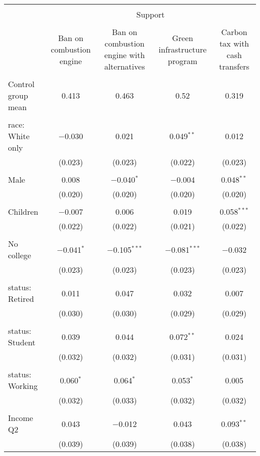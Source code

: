 
\begin{tabular}{@{\extracolsep{5pt}}lcccc} 
\\[-1.8ex]\hline 
\hline \\[-1.8ex] 
 & \multicolumn{4}{c}{Support} \\ 
\cline{2-5} 
\\[-1.8ex] & Ban on combustion engine & Ban on combustion engine with alternatives & Green infrastructure program & Carbon tax with cash transfers \\ 
\hline \\[-1.8ex] 
 Control group mean & 0.413 & 0.463 & 0.52 & 0.319  \\ \hline \\[-1.8ex] race: White only & $-$0.030 & 0.021 & 0.049$^{**}$ & 0.012 \\ 
  & (0.023) & (0.023) & (0.022) & (0.023) \\ 
  & & & & \\ 
 Male & 0.008 & $-$0.040$^{*}$ & $-$0.004 & 0.048$^{**}$ \\ 
  & (0.020) & (0.020) & (0.020) & (0.020) \\ 
  & & & & \\ 
 Children & $-$0.007 & 0.006 & 0.019 & 0.058$^{***}$ \\ 
  & (0.022) & (0.022) & (0.021) & (0.022) \\ 
  & & & & \\ 
 No college & $-$0.041$^{*}$ & $-$0.105$^{***}$ & $-$0.081$^{***}$ & $-$0.032 \\ 
  & (0.023) & (0.023) & (0.023) & (0.023) \\ 
  & & & & \\ 
 status: Retired & 0.011 & 0.047 & 0.032 & 0.007 \\ 
  & (0.030) & (0.030) & (0.029) & (0.029) \\ 
  & & & & \\ 
 status: Student & 0.039 & 0.044 & 0.072$^{**}$ & 0.024 \\ 
  & (0.032) & (0.032) & (0.031) & (0.031) \\ 
  & & & & \\ 
 status: Working & 0.060$^{*}$ & 0.064$^{*}$ & 0.053$^{*}$ & 0.005 \\ 
  & (0.032) & (0.033) & (0.032) & (0.032) \\ 
  & & & & \\ 
 Income Q2 & 0.043 & $-$0.012 & 0.043 & 0.093$^{**}$ \\ 
  & (0.039) & (0.039) & (0.038) & (0.038) \\ 

\end{tabular}
